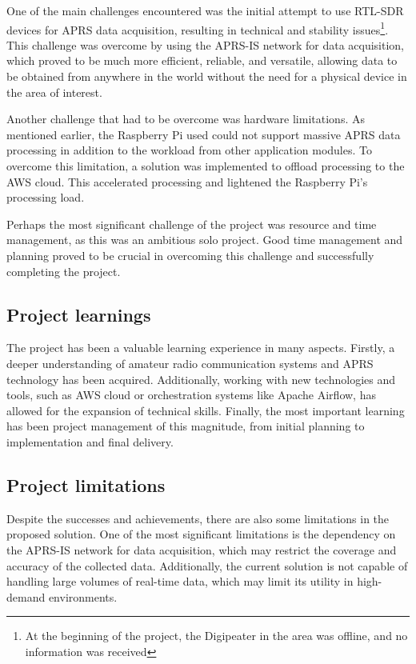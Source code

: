 One of the main challenges encountered was the initial attempt to use RTL-SDR devices for APRS data acquisition, resulting in technical and stability issues\footnote{At the beginning of the project, the Digipeater in the area was offline, and no information was received}. This challenge was overcome by using the APRS-IS network for data acquisition, which proved to be much more efficient, reliable, and versatile, allowing data to be obtained from anywhere in the world without the need for a physical device in the area of interest.

Another challenge that had to be overcome was hardware limitations. As mentioned earlier, the Raspberry Pi used could not support massive APRS data processing in addition to the workload from other application modules. To overcome this limitation, a solution was implemented to offload processing to the AWS cloud. This accelerated processing and lightened the Raspberry Pi's processing load.

Perhaps the most significant challenge of the project was resource and time management, as this was an ambitious solo project. Good time management and planning proved to be crucial in overcoming this challenge and successfully completing the project.

\subsection{Project learnings}

The project has been a valuable learning experience in many aspects. Firstly, a deeper understanding of amateur radio communication systems and APRS technology has been acquired. Additionally, working with new technologies and tools, such as AWS cloud or orchestration systems like Apache Airflow, has allowed for the expansion of technical skills. Finally, the most important learning has been project management of this magnitude, from initial planning to implementation and final delivery.

\subsection{Project limitations}

Despite the successes and achievements, there are also some limitations in the proposed solution. One of the most significant limitations is the dependency on the APRS-IS network for data acquisition, which may restrict the coverage and accuracy of the collected data. Additionally, the current solution is not capable of handling large volumes of real-time data, which may limit its utility in high-demand environments.

